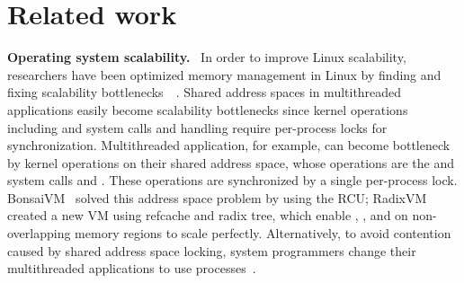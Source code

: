\section{Related work} \label{sec:RelatedWork}
\ifkor
\noindent
\textbf{Operating system scalability.}
~\cite{Clements15SCR}In order to improve Linux scalability, researchers have
been optimized memory management in Linux by finding and fixing scalability
bottlenecks~\cite{BoydWickizer2008Corey}~\cite{BoydWickizer2012OLS}.
Shared address spaces in multithreaded applications 
easily become scalability bottlenecks since kernel operations 
including  and  system calls and 
 handling require per-process locks for synchronization.
Multithreaded application, for example, can become bottleneck by kernel
operations on their shared address space, whose operations are the 
and  system calls and .
These operations are synchronized by a single per-process lock.
BonsaiVM~\cite{AustinTClements2012RCUBalancedTrees} solved this address space
problem by using the RCU;
RadixVM~\cite{Clements2013RadixVM} created a new VM using refcache and radix
tree, which enable , , and  on
non-overlapping memory regions to scale perfectly.
Alternatively, to avoid contention caused by shared address space locking,
system programmers change their multithreaded applications to use
processes~\cite{SilasBoydWickizer2010LinuxScales48}.
\else

\fi


